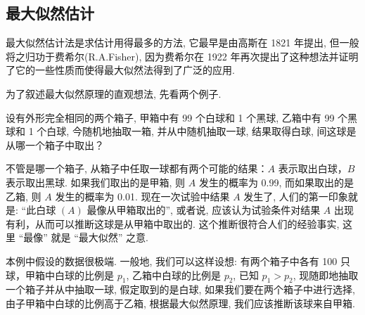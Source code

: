 \subsection{最大似然估计}%

最大似然估计法是求估计用得最多的方法, 它最早是由高斯在 1821 年提出, 但一般将之归功于费希尔(R.A.Fisher), 因为费希尔在 1922 年再次提出了这种想法并证明了它的一些性质而使得最大似然法得到了广泛的应用.

为了叙述最大似然原理的直观想法, 先看两个例子.

\begin{example}
设有外形完全相同的两个箱子, 甲箱中有 99 个白球和 1 个黑球, 乙箱中有 99 个黑球和 1 个白球, 今随机地抽取一箱, 并从中随机抽取一球, 结果取得白球, 间这球是从哪一个箱子中取出？
\end{example}
\begin{solution}
不管是哪一个箱子, 从箱子中任取一球都有两个可能的结果：$A$ 表示取出白球，$B$ 表示取出黑球. 如果我们取出的是甲箱, 则 $A$ 发生的概率为 0.99, 而如果取出的是乙箱, 则 $A$ 发生的概率为 0.01. 现在一次试验中结果 $A$ 发生了, 人们的第一印象就是: “此白球 $(A)$ 最像从甲箱取出的”, 或者说, 应该认为试验条件对结果 $A$ 出现有利，从而可以推断这球是从甲箱中取出的. 这个推断很符合人们的经验事实, 这里 “最像” 就是 “最大似然” 之意.

本例中假设的数据很极端. 一般地, 我们可以这样设想: 有两个箱子中各有 100 只球，甲箱中白球的比例是 $p_1$, 乙箱中白球的比例是 $p_2$, 已知 $p_1>p_2$, 现随即地抽取一个箱子并从中抽取一球, 假定取到的是白球, 如果我们要在两个箱子中进行选择, 由子甲箱中白球的比例高于乙箱, 根据最大似然原理, 我们应该推断该球来自甲箱.
\end{solution}

